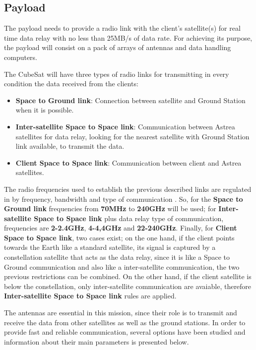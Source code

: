\subsection{Payload}
The payload needs to provide a radio link with the client's satellite(s) for real time data relay with no less than 25MB/s of data rate. For achieving its purpose, the payload will consist on a pack of arrays of antennas and data handling computers.

The CubeSat will have three types of radio links for transmitting in every condition the data received from the clients:
\begin{itemize}
\item \textbf{Space to Ground link}: Connection between satellite and Ground Station when it is possible.
\item \textbf{Inter-satellite Space to Space link}: Communication between Astrea satellites for data relay, looking for the nearest satellite with Ground Station link available, to transmit the data.
\item \textbf{Client Space to Space link}: Communication between client and Astrea satellites.
\end{itemize}

The radio frequencies used to establish the previous described links are regulated in \cite{SecretariadeEstadodetelecomunicacionesyparalasociedaddelainformacion.2015} by frequency, bandwidth and type of communication . So, for the \textbf{Space to Ground link} frequencies from \textbf{70MHz} to \textbf{240GHz} will be used; for \textbf{Inter-satellite Space to Space link} plus data relay type of communication, frequencies are \textbf{2-2.4GHz}, \textbf{4-4,4GHz} and \textbf{22-240GHz}. Finally, for \textbf{Client Space to Space link}, two cases exist; on the one hand, if the client points towards the Earth like a standard satellite, its signal is captured by a constellation satellite that acts as the data relay, since it is like a Space to Ground communication and also like a inter-satellite communication, the two previous restrictions can be combined. On the other hand, if the client satellite is below the constellation, only inter-satellite communication are avaiable, therefore \textbf{Inter-satellite Space to Space link} rules are applied.

The antennas are essential in this mission, since their role is to transmit and receive the data from other satellites as well as the ground stations. In order to provide fast and reliable communication, several options have been studied and information about their main parameters is presented below.

